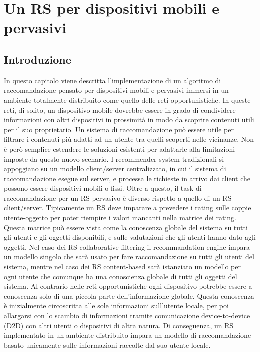 \documentclass[12pt,italian]{report}
\begin{document}
% 
% 

\chapter{Un RS per dispositivi mobili e pervasivi}
\label{chap:classificatore}
\section{Introduzione}

In questo capitolo viene descritta l'implementazione di un algoritmo di raccomandazione pensato per dispositivi mobili e pervasivi immersi in un ambiente totalmente distribuito come quello delle reti opportunistiche.
In queste reti, di solito, un dispositivo mobile dovrebbe essere in grado di condividere informazioni con altri dispositivi in prossimità in modo da scoprire contenuti utili per il suo proprietario. Un sistema di raccomandazione può essere utile per filtrare i contenuti più adatti ad un utente tra quelli scoperti nelle vicinanze. Non è però semplice estendere le soluzioni esistenti per adattarle alla limitazioni imposte da questo nuovo scenario. I recommender system tradizionali si appoggiano su un modello client/server centralizzato, in cui il sistema di raccomandazione esegue sul server, e processa le richieste in arrivo dai client che possono essere dispositivi mobili o fissi. Oltre a questo, il task di raccomandazione per un RS pervasivo è diverso rispetto a quello di un RS client/server. Tipicamente un RS deve imparare a prevedere i rating sulle coppie utente-oggetto per poter riempire i valori mancanti nella matrice dei rating. Questa matrice può essere vista come la conoscenza globale del sistema su tutti gli utenti e gli oggetti disponibili, e sulle valutazioni che gli utenti hanno dato agli oggetti. Nel caso dei RS collaborative-filtering il recommandation engine impara un modello singolo che sarà usato per fare raccomandazione su tutti gli utenti del sistema, mentre nel caso dei RS content-based sarà istanziato un modello per ogni utente che comunque ha una conoscienza globale di tutti gli oggetti del sistema. Al contrario nelle reti opportunistiche ogni dispositivo potrebbe essere a conoscenza solo di una piccola parte dell'informazione globale. Questa conoscenza è inizialmente circoscritta alle sole informazioni sull'utente locale, per poi allargarsi con lo scambio di informazioni tramite comunicazione device-to-device (D2D) con altri utenti o dispositivi di altra natura. Di conseguenza, un RS implementato in un ambiente distribuito impara un modello di raccomandazione basato unicamente sulle informazioni raccolte dal suo utente locale.
\end{document}
